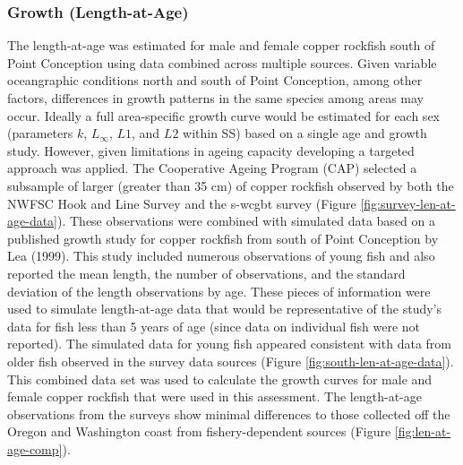 \documentclass[11pt,
  english,
  a4paper,
]{article}
\begin{document}
\leavevmode\tagmcend\tagstructend\par


\hypertarget{growth-length-at-age}{%
\subsubsection{Growth (Length-at-Age)}\label{growth-length-at-age}}

\leavevmode\tagmcend\tagstructend


The length-at-age was estimated for male and female copper rockfish south of Point Conception using data combined across multiple sources. Given variable oceangraphic conditions north and south of Point Conception, among other factors, differences in growth patterns in the same species among areas may occur. Ideally a full area-specific growth curve would be estimated for each sex (parameters {\(k\)\leavevmode\tagmcend\tagstructend}, {\(L_{\infty}\)\leavevmode\tagmcend\tagstructend}, {\(L1\)\leavevmode\tagmcend\tagstructend}, and {\(L2\)\leavevmode\tagmcend\tagstructend} within SS) based on a single age and growth study. However, given limitations in ageing capacity developing a targeted approach was applied. The Cooperative Ageing Program (CAP) selected a subsample of larger (greater than 35 cm) of copper rockfish observed by both the NWFSC Hook and Line Survey and the \Gls{s-wcgbt} survey (Figure \ref{fig:survey-len-at-age-data}). These observations were combined with simulated data based on a published growth study for copper rockfish from south of Point Conception by Lea {(1999)\leavevmode\tagmcend\tagstructend}. This study included numerous observations of young fish and also reported the mean length, the number of observations, and the standard deviation of the length observations by age. These pieces of information were used to simulate length-at-age data that would be representative of the study's data for fish less than 5 years of age (since data on individual fish were not reported). The simulated data for young fish appeared consistent with data from older fish observed in the survey data sources (Figure \ref{fig:south-len-at-age-data}). This combined data set was used to calculate the growth curves for male and female copper rockfish that were used in this assessment. The length-at-age observations from the surveys show minimal differences to those collected off the Oregon and Washington coast from fishery-dependent sources (Figure \ref{fig:len-at-age-comp}).
\end{document}
